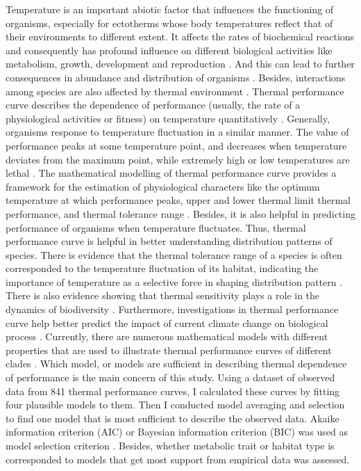 \documentclass[11pt]{article}
\begin{document}
  Temperature is an important abiotic factor that influences the functioning of organisms, especially 
  for ectotherms whose body temperatures reflect that of their environments to different extent. It affects 
  the rates of biochemical reactions and consequently has profound influence on different biological 
  activities like metabolism, growth, development and reproduction \cite{sinclair2016can}. And this can 
  lead to further consequences in abundance and distribution of organisms \cite{schulte2011thermal}. 
  Besides, interactions among species are also affected by thermal environment \cite{grigaltchik2012thermal}.  
  \newline
  Thermal performance curve describes the dependence of performance (usually, the rate of a physiological 
  activities or fitness) on temperature quantitatively \cite{sinclair2016can}. Generally, organisms response 
  to temperature fluctuation in a similar manner. The value of performance peaks at some temperature point, 
  and decreases when temperature deviates from the maximum point, while extremely high or low temperatures are lethal 
  \cite{sinclair2016can,krenek2011thermal}. 
  The mathematical modelling of thermal performance curve provides a framework for the estimation of 
  physiological characters like the optimum temperature at which performance peaks, upper and lower 
  thermal limit thermal performance, and thermal tolerance range \cite{krenek2011thermal}. 
  Besides, it is also helpful in predicting 
  performance of organisms when temperature fluctuates. Thus, thermal performance curve is helpful in better 
  understanding distribution patterns of species. There is evidence that 
  the thermal tolerance range of a species is often corresponded 
  to the temperature fluctuation of its habitat, indicating the 
  importance of temperature as a selective force in shaping distribution pattern \cite{sunday2011global, clusella2011climatic}. 
  There is also evidence showing 
  that thermal sensitivity plays a role in the dynamics of biodiversity \cite{allen2002global}. Furthermore, 
  investigations in thermal performance curve help better predict the impact of current climate change on 
  biological process \cite{krenek2011thermal, sears2011introduction}.  
  \newline
  Currently, there are numerous mathematical models with different properties  
  that are used to illustrate thermal performance curves of different clades 
  \cite{krenek2011thermal,angilletta2006estimating}. Which model, or models are sufficient in describing thermal dependence 
  of performance is the main concern of this study. 
  Using a dataset of observed data from 841 thermal performance curves, 
  I calculated these curves by fitting 
  four plausible models to them. 
  Then I conducted model averaging and selection to find one model that is most sufficient to describe the observed data.
   Akaike information criterion (AIC) or 
  Bayesian information criterion (BIC) was used as model selection criterion \cite{johnson2004model}. 
  Besides, whether metabolic trait or habitat type is corresponded to models that get most support from 
  empirical data was assessed.
\end{document}

